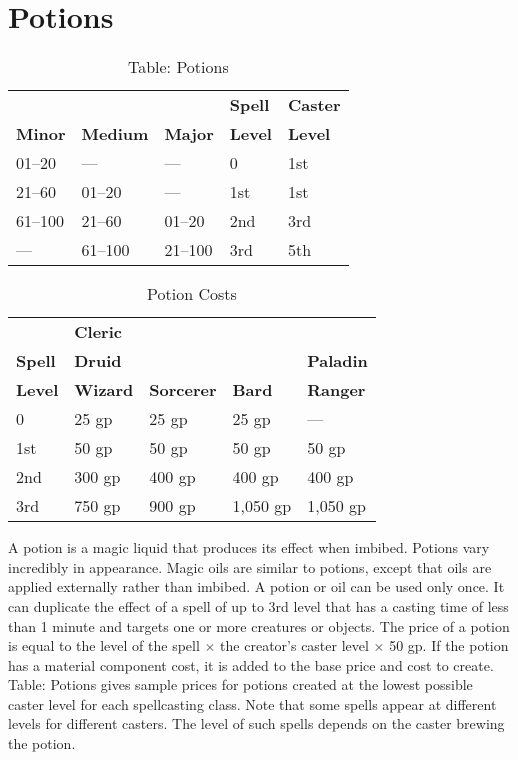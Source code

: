 \section{Potions}

\label{f0}
\begin{table}[]
\sffamily
\caption{Table: Potions}
\begin{tabular}{lllll}
               &                 &                & \textbf{Spell} & \textbf{Caster} \\
\textbf{Minor} & \textbf{Medium} & \textbf{Major} & \textbf{Level} & \textbf{Level}\\
01--20 & --- & --- & 0 & 1st\\
21--60 & 01--20 & --- & 1st & 1st\\
 61--100 & 21--60 & 01--20 & 2nd & 3rd\\
 --- & 61--100 & 21--100 & 3rd & 5th\\
\end{tabular}
\end{table}

\begin{table}
 \sffamily
 \caption{Potion Costs}
 \begin{tabular}{lllll}
               & \textbf{Cleric} & \\
\textbf{Spell} & \textbf{Druid}  &                   &               & \textbf{Paladin} \\
\textbf{Level} & \textbf{Wizard} & \textbf{Sorcerer} & \textbf{Bard} & \textbf{Ranger} \\
0 & 25 gp & 25 gp & 25 gp & ---\\
1st & 50 gp & 50 gp & 50 gp & 50 gp\\
2nd & 300 gp & 400 gp & 400 gp & 400 gp\\
3rd & 750 gp & 900 gp & 1,050 gp & 1,050 gp\\
 \end{tabular}

\end{table}

				
A potion is a magic liquid that produces its effect when imbibed. Potions vary incredibly in appearance. Magic oils are similar to potions, except that oils are applied externally rather than imbibed. A potion or oil can be used only once. It can duplicate the effect of a spell of up to 3rd level that has a casting time of less than 1 minute and targets one or more creatures or objects. The price of a potion is equal to the level of the spell \mbox{$\times$} the creator's caster level \mbox{$\times$} 50 gp. If the potion has a material component cost, it is added to the base price and cost to create. Table: Potions gives sample prices for potions created at the lowest possible caster level for each spellcasting class. Note that some spells appear at different levels for different casters. The level of such spells depends on the caster brewing the potion.
				
